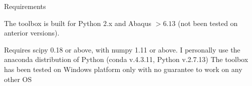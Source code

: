 \begin{frame}{Requirements}

\vfill
The toolbox is built for Python 2.x and Abaqus $>6.13$ (not been tested on anterior versions).

Requires scipy 0.18 or above, with numpy 1.11 or above.
\vfill
I personally use the anaconda distribution of Python (conda v.4.3.11, Python v.2.7.13)
\vfill
The toolbox has been tested on Windows platform only with no guarantee to work on any other OS
\vfill

\end{frame}